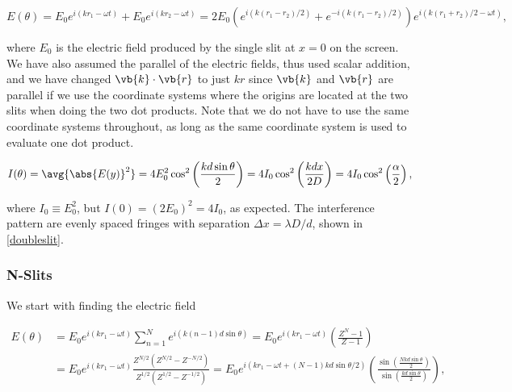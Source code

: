 \documentclass[english,a4paper,12pt]{report}
\begin{document}
\begin{equation}
    E(\theta ) = E_0 e^{i(kr_1 - \omega t)} + E_0 e^{i(kr_2 - \omega t)} = 2E_0 \left( e^{i(k(r_1 -r_2 )/2)} + e^{-i(k(r_1 -r_2 )/2)}    \right) e^{i (k(r_1 +r_2 ) /2- \omega t)},   
\end{equation}

where \(E_0 \) is the electric field produced by the single slit at \(x=0\) on the screen. We have also assumed the parallel of the electric fields, thus used scalar addition, and we have changed \(\vb{k} \cdot \vb{r} \) to just \(kr\) since \(\vb{k} \) and \(\vb{r} \) are parallel if we use the coordinate systems where the origins are located at the two slits when doing the two dot products. Note that we do not have to use the same coordinate systems throughout, as long as the same coordinate system is used to evaluate one dot product.

\begin{equation}
    I(\theta ) = \avg{\abs{E(y)}^2 } = 4 E_0 ^2\cos ^2\left( \frac{kd \sin \theta }{2}  \right) = 4I_0 \cos ^2\left( \frac{kdx}{2D}  \right) = 4I_0 \cos ^2\left( \frac{\alpha }{2}  \right),
\end{equation}

where \(I_0 \equiv  E_0 ^2\), but \(I(0) = (2E_0 )^2 = 4I_0 \), as expected. The interference pattern are evenly spaced fringes with separation \(\Delta x = \lambda D /d\), shown in \cref{doubleslit}. 


\subsubsection{N-Slits}

We start with finding the electric field 

\begin{equation}
    \begin{aligned} 
    E(\theta ) &= E_0 e^{i(kr_1 -\omega t)} \sum_{n=1}^{N} e^{i(k(n-1)d\sin \theta )} = E_0 e^{i(kr_1 - \omega t)} \left( \frac{Z^{N}-1 }{Z-1}  \right) \\
    &= E_0 e^{i(kr_1 -\omega t)} \frac{Z^{N /2}(Z^{N /2} - Z^{-N /2}  ) }{Z^{1 /2} (Z^{1 /2} - Z^{- 1/2}  ) } = E_0 e^{i(kr_1 -\omega t + (N-1)kd\sin \theta /2)} \left( \frac{\sin \left(\frac{Nkd\sin \theta }{2} \right)}{\sin \left( \frac{kd\sin \theta }{2}  \right)}  \right),
    \end{aligned}        
\end{equation}
\end{document}
